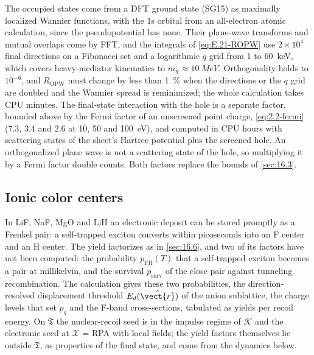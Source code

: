 The occupied states come from a DFT ground state (SG15) as maximally localized Wannier functions, with the 1s orbital from an all-electron atomic calculation, since the pseudopotential has none. Their plane-wave transforms and mutual overlaps come by FFT, and the integrals of \cref{eq:E.21-ROPW} use $2\times10^4$ final directions on a Fibonacci set and a logarithmic $q$ grid from 1 to \SI{60}{keV}, which covers heavy-mediator kinematics to $m_\chi \approx \SI{10}{MeV}$. Orthogonality holds to $10^{-6}$, and $R_{\mathrm{OPW}}$ must change by less than \SI{1}{\percent} when the directions or the $q$ grid are doubled and the Wannier spread is reminimized; the whole calculation takes CPU minutes. The final-state interaction with the hole is a separate factor, bounded above by the Fermi factor of an unscreened point charge, \cref{eq:2.2-fermi} (7.3, 3.4 and 2.6 at 10, 50 and \SI{100}{eV}), and computed in CPU hours with scattering states of the sheet's Hartree potential plus the screened hole. An orthogonalized plane wave is not a scattering state of the hole, so multiplying it by a Fermi factor double counts. Both factors replace the bounds of \cref{sec:16.3}.

\subsection{Ionic color centers}

In LiF, NaF, MgO and LiH an electronic deposit can be stored promptly as a Frenkel pair: a self-trapped exciton converts within picoseconds into an F center and an H center. The yield factorizes as in \cref{sec:16.6}, and two of its factors have not been computed: the probability $p_{\mathrm{FH}}(T)$ that a self-trapped exciton becomes a pair at millikelvin, and the survival $p_{\mathrm{surv}}$ of the close pair against tunneling recombination. The calculation gives these two probabilities, the direction-resolved displacement threshold $E_d(\hat{\vect{r}})$ of the anion sublattice, the charge levels that set $p_q$ and the F-band cross-sections, tabulated as yields per recoil energy. On $\mathfrak{T}$ the nuclear-recoil seed is in the impulse regime of $\mathcal{K}$ and the electronic seed at $\mathcal{X}$ = RPA with local fields; the yield factors themselves lie outside $\mathfrak{T}$, as properties of the final state, and come from the dynamics below.


